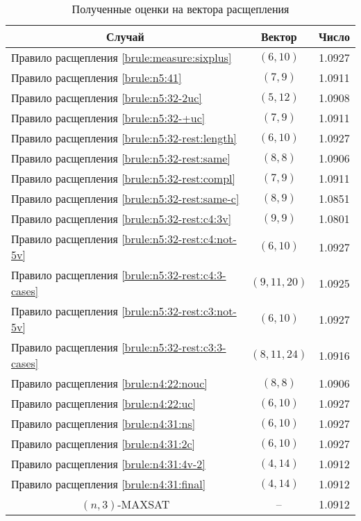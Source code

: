 \begin{table}[ht]
 \centering
 \caption{Полученные оценки на вектора расщепления}
 \begin{tabular}{|l|c|c|}
  \hline
  \multicolumn{1}{|c|}{\textbf{Случай}} & \textbf{Вектор} & \textbf{Число} \\
  \hline
  Правило расщепления \ref{brule:measure:sixplus}
          & $(6,10)$
          & 1.0927 \\
  Правило расщепления \ref{brule:n5:41}
          & $(7,9)$
          & 1.0911 \\
  Правило расщепления \ref{brule:n5:32-2uc}
          & $(5,12)$
          & 1.0908 \\
  Правило расщепления \ref{brule:n5:32-+uc}
          & $(7,9)$
          & 1.0911 \\
  Правило расщепления \ref{brule:n5:32-rest:length}
          & $(6,10)$
          & 1.0927 \\
  Правило расщепления \ref{brule:n5:32-rest:same}
          & $(8,8)$
          & 1.0906 \\
  Правило расщепления \ref{brule:n5:32-rest:compl}
          & $(7,9)$
          & 1.0911 \\
  Правило расщепления \ref{brule:n5:32-rest:same-c}
          & $(8,9)$
          & 1.0851 \\
  Правило расщепления \ref{brule:n5:32-rest:c4:3v}
          & $(9,9)$
          & 1.0801 \\
  Правило расщепления \ref{brule:n5:32-rest:c4:not-5v}
          & $(6,10)$
          & 1.0927 \\
  Правило расщепления \ref{brule:n5:32-rest:c4:3-cases}
          & $(9,11,20)$
          & 1.0925 \\
  Правило расщепления \ref{brule:n5:32-rest:c3:not-5v}
          & $(6,10)$
          & 1.0927 \\
  Правило расщепления \ref{brule:n5:32-rest:c3:3-cases}
          & $(8,11,24)$
          & 1.0916 \\
  Правило расщепления \ref{brule:n4:22:nouc}
          & $(8,8)$
          & 1.0906 \\
  Правило расщепления \ref{brule:n4:22:uc}
          & $(6,10)$
          & 1.0927 \\
  Правило расщепления \ref{brule:n4:31:ns}
          & $(6,10)$
          & 1.0927 \\
  Правило расщепления \ref{brule:n4:31:2c}
          & $(6,10)$
          & 1.0927 \\
  Правило расщепления \ref{brule:n4:31:4v-2}
          & $(4,14)$
          & 1.0912 \\
  Правило расщепления \ref{brule:n4:31:final}
          & $(4,14)$
          & 1.0912 \\
  \hline
  \multicolumn{1}{|c|}{$(n,3)$-MAXSAT}
          & --
          & 1.0912 \\
  \hline
 \end{tabular}
 \label{table:conclusion:vectors}
\end{table}

